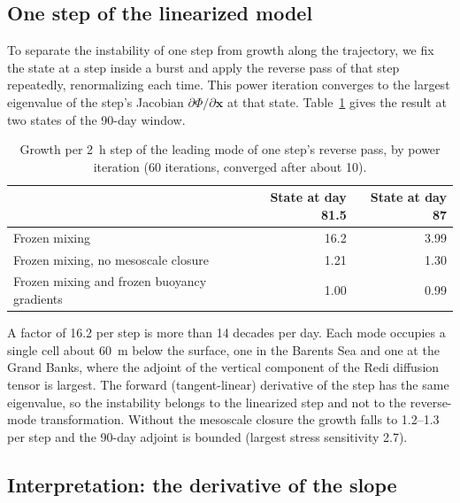 \documentclass[11pt]{article}
\newcommand{\xx}{\mathbf{x}}
\begin{document}
\subsection{One step of the linearized model}

To separate the instability of one step from growth along the trajectory, we fix the state at a step inside a
burst and apply the reverse pass of that step repeatedly, renormalizing each time. This power iteration converges
to the largest eigenvalue of the step's Jacobian $\partial\Phi/\partial\xx$ at that state. Table~\ref{tab:jacobian}
gives the result at two states of the 90-day window.

\begin{table}[ht]
\centering\small
\begin{tabular}{@{}lrr@{}}
\toprule
& State at day 81.5 & State at day 87 \\
\midrule
Frozen mixing & 16.2 & 3.99 \\
Frozen mixing, no mesoscale closure & 1.21 & 1.30 \\
Frozen mixing and frozen buoyancy gradients & 1.00 & 0.99 \\
\bottomrule
\end{tabular}
\caption{Growth per \SI{2}{h} step of the leading mode of one step's reverse pass, by power iteration (60
iterations, converged after about 10).}
\label{tab:jacobian}
\end{table}

A factor of 16.2 per step is more than 14 decades per day. Each mode occupies a single cell about \SI{60}{m} below the
surface, one in the Barents Sea and one at the Grand Banks, where the adjoint of the vertical component of the
Redi diffusion tensor is largest. The forward (tangent-linear) derivative of the step has the same eigenvalue, so
the instability belongs to the linearized step and not to the reverse-mode transformation. Without the mesoscale
closure the growth falls to 1.2--1.3 per step and the 90-day adjoint is bounded (largest stress sensitivity 2.7).

\subsection{Interpretation: the derivative of the slope}
\end{document}
